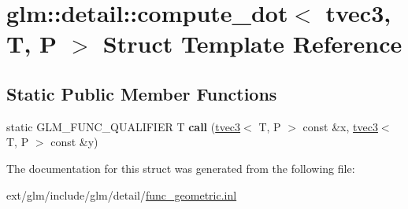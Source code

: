 \hypertarget{structglm_1_1detail_1_1compute__dot_3_01tvec3_00_01_t_00_01_p_01_4}{\section{glm\-:\-:detail\-:\-:compute\-\_\-dot$<$ tvec3, T, P $>$ Struct Template Reference}
\label{structglm_1_1detail_1_1compute__dot_3_01tvec3_00_01_t_00_01_p_01_4}
}
\subsection*{Static Public Member Functions}
\begin{DoxyCompactItemize}
\item 
\hypertarget{structglm_1_1detail_1_1compute__dot_3_01tvec3_00_01_t_00_01_p_01_4_afab12cf4d0dd0e1033fc17fd4dd53da8}{static G\-L\-M\-\_\-\-F\-U\-N\-C\-\_\-\-Q\-U\-A\-L\-I\-F\-I\-E\-R T {\bfseries call} (\hyperlink{structglm_1_1tvec3}{tvec3}$<$ T, P $>$ const \&x, \hyperlink{structglm_1_1tvec3}{tvec3}$<$ T, P $>$ const \&y)}\label{structglm_1_1detail_1_1compute__dot_3_01tvec3_00_01_t_00_01_p_01_4_afab12cf4d0dd0e1033fc17fd4dd53da8}

\end{DoxyCompactItemize}


The documentation for this struct was generated from the following file\-:\begin{DoxyCompactItemize}
\item 
ext/glm/include/glm/detail/\hyperlink{func__geometric_8inl}{func\-\_\-geometric.\-inl}\end{DoxyCompactItemize}
